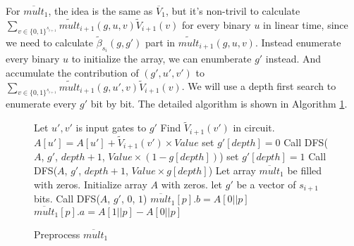 For $\overline{mult}_1$, the idea is the same as $\overline{V}_1$, but it's non-trivil to calculate $\sum_{v\in \{0,1\}^{s_{i+1}}}\tilde{mult}_{i+1}(g, u, v)\tilde{V}_{i+1}(v)$ for every binary $u$ in linear time, since we need to calculate $\tilde{\beta}_{s_{i}}(g, g')$ part in $\tilde{mult}_{i+1}(g, u, v)$. Instead enumerate every binary $u$ to initialize the array, we can enumberate $g'$ instead. And accumulate the contribution of $(g', u', v')$ to $\sum_{v\in \{0,1\}^{s_{i+1}}}\tilde{mult}_{i+1}(g, u', v)\tilde{V}_{i+1}(v)$. We will use a depth first search to enumerate every $g'$ bit by bit. The detailed algorithm is shown in Algorithm \ref{alg::premult}.
\begin{figure}[p]
\begin{algorithm}[H]
\label{alg::premult}
\caption{Preprocess $\overline{mult}_1$}
\begin{algorithmic}[1]
	 
		\State Let $u', v'$ is input gates to $g'$
		\State Find $\tilde{V}_{i+1}(v')$ in circuit.
		\State $A[u'] = A[u'] + \tilde{V}_{i+1}(v')\times Value$
	\Else
		\State set $g'[depth]=0$
		\State Call {\sf DFS}($A$, $g'$, $depth+1$, $Value\times(1-g[depth])$)
		\State set $g'[depth]=1$
		\State Call {\sf DFS}($A$, $g'$, $depth+1$, $Value\times g[depth]$)
	\EndIf
\EndProcedure
{}
	\State Let array $\overline{mult}_1$ be filled with zeros.
	\State Initialize array $A$ with zeros.
	\State let $g'$ be a vector of $s_{i+1}$ bits.
	\State Call {\sf DFS}($A$, $g'$, $0$, $1$)
		\State $\overline{mult}_1[p].b=A[0||p]$
		\State $\overline{mult}_1[p].a=A[1||p]-A[0||p]$
	\EndFor
\EndProcedure
\end{algorithmic}
\end{algorithm}
\end{figure}

